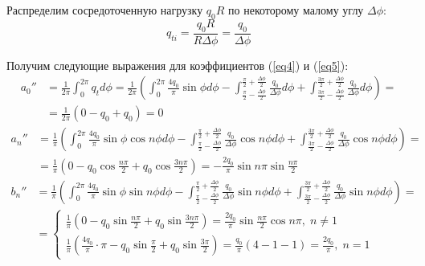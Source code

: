 Распределим сосредоточенную нагрузку $q_0R$ по некоторому малому углу $\Delta\phi$:
\begin{equation}
    \label{eq8.1}
    q_{ti} = \frac{q_0R}{R \Delta \phi} = \frac{q_0}{\Delta \phi}
\end{equation}

Получим следующие выражения для коэффициентов (\ref{eq4}) и (\ref{eq5}):
\begin{equation}
    \label{eq8.2}
    \begin{split}
        a_0'' & = \frac{1}{2\pi} \int_{0}^{2\pi} q_t d\phi = \frac{1}{2\pi} \left(   \int_{0}^{2\pi} \frac{4q_0}{\pi}\sin \phi d\phi - \int_{\frac{\pi}{2} - \frac{\Delta\phi}{2}}^{\frac{\pi}{2} + \frac{\Delta\phi}{2}}\frac{q_0}{\Delta \phi} d\phi + \int_{\frac{3\pi}{2} - \frac{\Delta\phi}{2}}^{\frac{3\pi}{2} + \frac{\Delta\phi}{2}} \frac{q_0}{\Delta \phi} d\phi \right) =
        \\
        & = \frac{1}{2\pi} \left( 0 - q_0 + q_0 \right) = 0
    \end{split}
\end{equation}
\begin{equation}
    \label{eq8.3}
    \begin{split}
        a_n'' & = \frac{1}{\pi} \left( \int_{0}^{2\pi} \frac{4q_0}{\pi}\sin \phi \cos n\phi d\phi - \int_{\frac{\pi}{2} - \frac{\Delta\phi}{2}}^{\frac{\pi}{2} + \frac{\Delta\phi}{2}}\frac{q_0}{\Delta \phi} \cos n\phi d\phi + \int_{\frac{3\pi}{2} - \frac{\Delta\phi}{2}}^{\frac{3\pi}{2} + \frac{\Delta\phi}{2}}\frac{q_0}{\Delta \phi} \cos n\phi d\phi \right) = 
        \\
        & = \frac{1}{\pi} \left( 0 - q_0 \cos \frac{n\pi}{2} + q_0 \cos \frac{3n\pi}{2} \right) = - \frac{2q_0}{\pi} \sin n\pi \sin \frac{n\pi}{2}
    \end{split}
\end{equation}
\begin{equation}
    \label{eq8.4}
    \begin{split}
        b_n'' & = \frac{1}{\pi} \left( \int_{0}^{2\pi} \frac{4q_0}{\pi}\sin \phi \sin n\phi d\phi - \int_{\frac{\pi}{2} - \frac{\Delta\phi}{2}}^{\frac{\pi}{2} + \frac{\Delta\phi}{2}}\frac{q_0}{\Delta \phi} \sin n\phi d\phi + \int_{\frac{3\pi}{2} - \frac{\Delta\phi}{2}}^{\frac{3\pi}{2} + \frac{\Delta\phi}{2}}\frac{q_0}{\Delta \phi} \sin n\phi d\phi \right) = 
        \\
        & = 
        \begin{cases}
            \displaystyle \frac{1}{\pi} \left( 0 - q_0 \sin \frac{n\pi}{2} + q_0 \sin \frac{3n\pi}{2} \right) = \frac{2q_0}{\pi} \sin \frac{n\pi}{2} \cos n\pi, \; n \neq 1
            \\[10pt]
            \displaystyle \frac{1}{\pi} \left( \frac{4q_0}{\pi} \cdot \pi - q_0 \sin \frac{\pi}{2} + q_0 \sin \frac{3\pi}{2} \right) = \frac{q_0}{\pi} \left( 4 - 1 - 1 \right) = \frac{2q_0}{\pi}, \; n = 1
        \end{cases}
    \end{split}
\end{equation}
